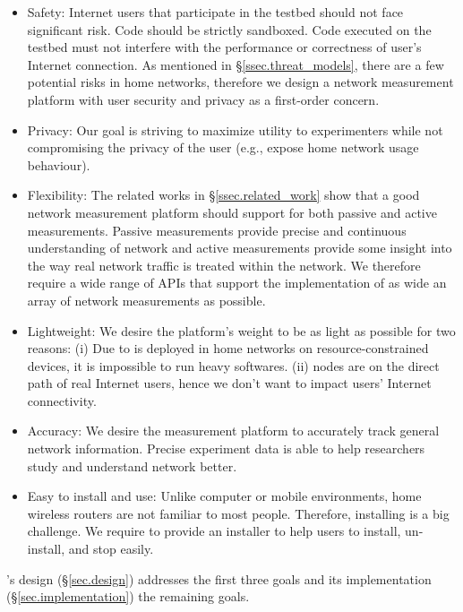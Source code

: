 \begin{itemize}
\item Safety: Internet users that participate in the testbed should not face significant risk. Code should be strictly sandboxed. Code executed on the testbed must not interfere with the performance or correctness of user's Internet connection. As mentioned in \S{\ref{ssec.threat_models}}, there are a few potential risks in home networks, therefore we design a network measurement platform with user security and privacy as a first-order concern.

\item Privacy: Our goal is striving to maximize utility to experimenters while not compromising the privacy of the user (e.g., expose home network usage behaviour).

\item Flexibility: The related works in \S{\ref{ssec.related_work}} show that a good network measurement platform should support for both passive and active measurements. Passive measurements provide precise and continuous understanding of network and active measurements provide some insight into the way real network traffic is treated within the network. We therefore require a wide range of APIs that support the implementation of as wide an array of network measurements as possible.

\item Lightweight: We desire the platform's weight to be as light as possible for two reasons: (i) Due to \sysname is deployed in home networks on resource-constrained devices, it is impossible to run heavy softwares. (ii) \sysname nodes are on the direct path of real Internet users, hence we don't want to impact users' Internet connectivity.

\item Accuracy: We desire the measurement platform to accurately track 
general network information. Precise experiment data is able to help researchers study and understand network better.

\item Easy to install and use: Unlike computer or mobile environments, home wireless routers are not familiar to most people. Therefore, installing is a big challenge. We require to provide an installer to help users to install, un-install, and stop easily.
\end{itemize}

\sysname's design (\S\ref{sec.design}) addresses the first three goals and its implementation (\S\ref{sec.implementation}) the remaining goals.